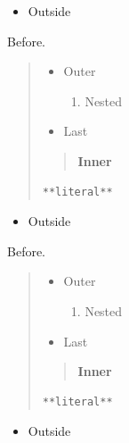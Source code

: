 \begin{itemize}
\item Outside
\end{itemize}
\begin{frame}[t,fragile]
Before.

\begin{quote}
\begin{itemize}
\item Outer
\begin{enumerate}
\item Nested
\end{enumerate}
\item Last
\end{itemize}

\begin{quote}
\textbf{Inner}
\end{quote}

\begin{verbatim}
**literal**
\end{verbatim}
\end{quote}

\begin{itemize}
\item Outside
\end{itemize}
\end{frame}

\begin{frame}[t,fragile]
Before.

\begin{quote}
\begin{itemize}
\item Outer
\begin{enumerate}
\item Nested
\end{enumerate}
\item Last
\end{itemize}

\begin{quote}
\textbf{Inner}
\end{quote}

\begin{verbatim}
**literal**
\end{verbatim}
\end{quote}

\begin{itemize}
\item Outside
\end{itemize}
\end{frame}


